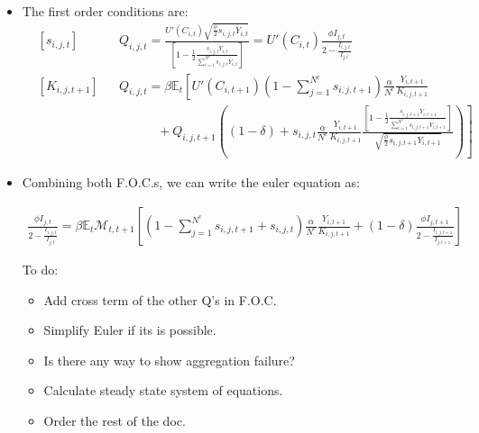 \documentclass[11pt]{article}
\newcommand{\E}{\mathbb{E}}
\numberwithin{equation}{section}
\begin{document}
\begin{itemize}
	\item The first order conditions are:
	\begin{align*}
	& \left[s_{i,j,t}\right] && Q_{i,j,t} = \frac{ U'(C_{i,t})\sqrt{\frac{\phi}{2} s_{i,j,t} Y_{i,t}}}{\left[1-\frac{1}{2} \frac{s_{i,j,t} Y_{i,t}}{\sum_{i=1}^{N^c} s_{i,j,t} Y_{i,t}}\right]} = U'(C_{i,t}) \frac{\phi I_{j,t}}{2-\frac{I_{i,j,t}}{I_{j,t}}} \\
	& \left[K_{i,j,t+1}\right] && Q_{i,j,t} = \beta \E_t \left[  U'(C_{i,t+1}) (1-\sum_{j=1}^{N^c} s_{i,j,t+1}) \frac{\alpha}{N^c} \frac{Y_{i,t+1}}{K_{i,j,t+1}} \right. \\
	  &   &&  \left. \quad  \qquad   +   Q_{i,j,t+1} \left( (1-\delta) + s_{i,j,t} \frac{\alpha}{N^c} \frac{Y_{i,t+1}}{K_{i,j,t+1}} \frac{ \left[1-\frac{1}{2} \frac{s_{i,j,t+1} Y_{i,t+1}}{\sum_{i=1}^{N^c} s_{i,j,t+1} Y_{i,t+1}}\right]}{\sqrt{\frac{\phi}{2} s_{i,j,t+1} Y_{i,t+1}}} \right) \right]
	\end{align*}
	
	\item Combining both F.O.C.s, we can write the  euler equation as:
	
	\begin{align*}
	\frac{\phi I_{j,t}}{2-\frac{I_{i,j,t}}{I_{j,t}}} = \beta \E_t \mathcal{M}_{t,t+1} \left[ (1-\sum_{j=1}^{N^c} s_{i,j,t+1} + s_{i,j,t}) \frac{\alpha}{N^c} \frac{Y_{i,t+1}}{K_{i,j,t+1}}    + (1-\delta) 	\frac{\phi I_{j,t+1}}{2-\frac{I_{i,j,t+1}}{I_{j,t+1}}} \right]
	\end{align*}
	{\color{red} To do: 
		\begin{itemize}
			\item Add cross term of the other Q's in F.O.C.
			\item Simplify Euler if its is possible.
			\item Is there any way to show aggregation failure?
			\item Calculate steady state system of equations. 
			\item Order the rest of the doc.
		\end{itemize}}
	
%	





\end{itemize}
\end{document}
